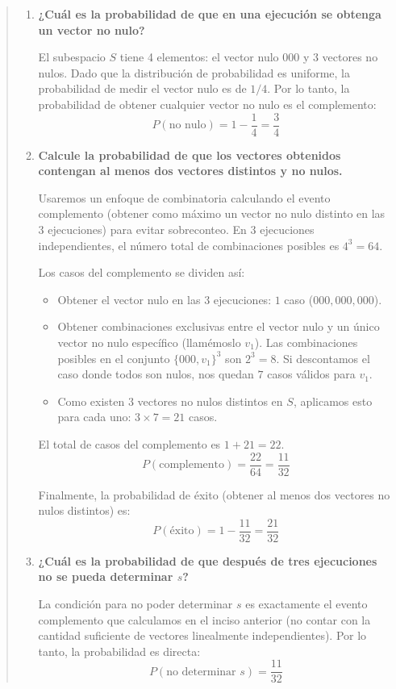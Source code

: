 \begin{quote}
    \begin{enumerate}
        \item[a)] \textbf{¿Cuál es la probabilidad de que en una ejecución se obtenga un vector no nulo?}

            El subespacio $S$ tiene 4 elementos: el vector nulo $000$ y 3 vectores no nulos. Dado que la distribución de probabilidad es uniforme, la probabilidad de medir el vector nulo es de $1/4$. Por lo tanto, la probabilidad de obtener cualquier vector no nulo es el complemento:
            $$
            P(\text{no nulo}) = 1 - \frac{1}{4} = \frac{3}{4}
            $$

        \item[b)] \textbf{Calcule la probabilidad de que los vectores obtenidos contengan al menos dos vectores distintos y no nulos.}

            Usaremos un enfoque de combinatoria calculando el evento complemento (obtener como máximo un vector no nulo distinto en las 3 ejecuciones) para evitar sobreconteo.
            En 3 ejecuciones independientes, el número total de combinaciones posibles es $4^3 = 64$.
            
            Los casos del complemento se dividen así:
            \begin{itemize}
                \item Obtener el vector nulo en las 3 ejecuciones: $1$ caso ($000, 000, 000$).
                \item Obtener combinaciones exclusivas entre el vector nulo y un único vector no nulo específico (llamémoslo $v_1$). Las combinaciones posibles en el conjunto $\{000, v_1\}^3$ son $2^3 = 8$. Si descontamos el caso donde todos son nulos, nos quedan $7$ casos válidos para $v_1$.
                \item Como existen $3$ vectores no nulos distintos en $S$, aplicamos esto para cada uno: $3 \times 7 = 21$ casos.
            \end{itemize}

            El total de casos del complemento es $1 + 21 = 22$.
            $$
            P(\text{complemento}) = \frac{22}{64} = \frac{11}{32}
            $$

            Finalmente, la probabilidad de éxito (obtener al menos dos vectores no nulos distintos) es:
            $$
            P(\text{éxito}) = 1 - \frac{11}{32} = \frac{21}{32}
            $$

        \item[c)] \textbf{¿Cuál es la probabilidad de que después de tres ejecuciones no se pueda determinar $s$?}

            La condición para no poder determinar $s$ es exactamente el evento complemento que calculamos en el inciso anterior (no contar con la cantidad suficiente de vectores linealmente independientes). Por lo tanto, la probabilidad es directa:
            $$
            P(\text{no determinar } s) = \frac{11}{32}
            $$
    \end{enumerate}
\end{quote}

\vspace{.5cm}

